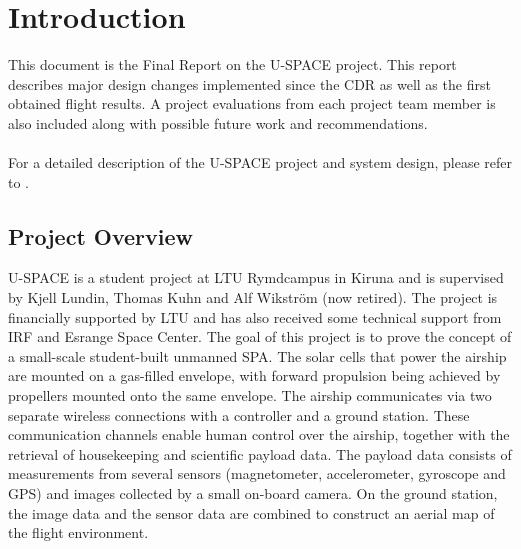 \newpage
\chapter{Introduction}
\label{chap:introduction}
%
This document is the Final Report on the \ac{U-SPACE} project. This report describes major design changes implemented since the \ac{CDR}\cite{CDR} as well as the first obtained flight results. A project evaluations from each project team member is also included along with possible future work and recommendations.
\\\\
%
For a detailed description of the \ac{U-SPACE} project and system design, please refer to \cite{CDR}.
%
\section{Project Overview}
\ac{U-SPACE} is a student project at \ac{LTU} Rymdcampus in Kiruna and is supervised by Kjell Lundin, Thomas Kuhn and Alf Wikstr\"{o}m (now retired). The project is financially supported by \ac{LTU} and has also received some technical support from \ac{IRF} and Esrange Space Center. The goal of this project is to prove the concept of a small-scale student-built unmanned \ac{SPA}. The solar cells that power the airship are mounted on a gas-filled envelope, with forward propulsion being achieved by propellers mounted onto the same envelope. The airship communicates via two separate wireless connections with a controller and a ground station. These communication channels enable human control over the airship, together with the retrieval of housekeeping and scientific payload data. The payload data consists of measurements from several sensors (magnetometer, accelerometer, gyroscope and \ac{GPS}) and images collected by a small on-board camera. On the ground station, the image data and the sensor data are combined to construct an aerial map of the flight environment.